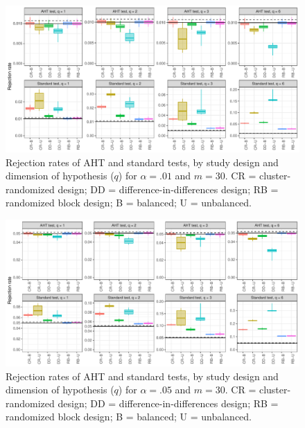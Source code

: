 \documentclass[12pt]{article}
\begin{document}
\begin{landscape}
\begin{figure}[H]
{\centering \includegraphics[width=\linewidth]{CR_fig/balance_01_30-1} 

}

\caption{Rejection rates of AHT and standard tests, by study design and dimension of hypothesis ($q$) for $\alpha = .01$ and $m = 30$. CR = cluster-randomized design; DD = difference-in-differences design; RB = randomized block design; B = balanced; U = unbalanced.}\label{fig:balance_01_30}
\end{figure}

\begin{figure}[H]

{\centering \includegraphics[width=\linewidth]{CR_fig/balance_05_30-1} 

}

\caption{Rejection rates of AHT and standard tests, by study design and dimension of hypothesis ($q$) for $\alpha = .05$ and $m = 30$. CR = cluster-randomized design; DD = difference-in-differences design; RB = randomized block design; B = balanced; U = unbalanced.}\label{fig:balance_05_30}
\end{figure}

\begin{figure}[H]


\end{figure}
\end{landscape}
\end{document}
